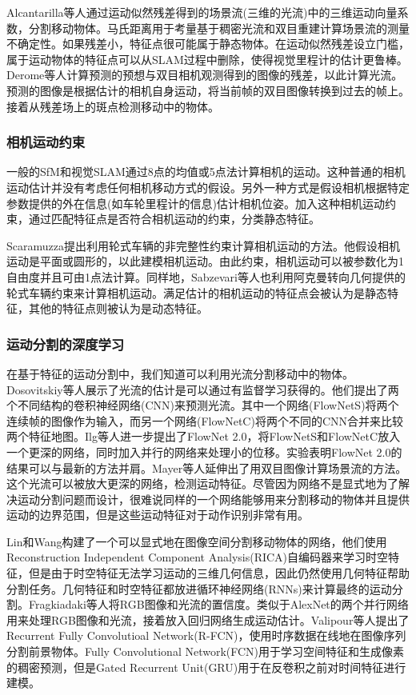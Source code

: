 Alcantarilla等人\cite{4}通过运动似然残差得到的场景流(三维的光流)中的三维运动向量系数，分割移动物体。马氏距离用于考量基于稠密光流和双目重建计算场景流的测量不确定性。如果残差小，特征点很可能属于静态物体。在运动似然残差设立门槛，属于运动物体的特征点可以从SLAM过程中删除，使得视觉里程计的估计更鲁棒。Derome等人\cite{30, 31}计算预测的预想与双目相机观测得到的图像的残差，以此计算光流。预测的图像是根据估计的相机自身运动，将当前帧的双目图像转换到过去的帧上。接着从残差场上的斑点检测移动中的物体。

\subsubsection{相机运动约束}
一般的SfM和视觉SLAM通过8点的均值\cite{53}或5点法\cite{116}计算相机的运动。这种普通的相机运动估计并没有考虑任何相机移动方式的假设。另外一种方式是假设相机根据特定参数提供的外在信息(如车轮里程计的信息)估计相机位姿。加入这种相机运动约束，通过匹配特征点是否符合相机运动的约束，分类静态特征。

Scaramuzza\cite{136}提出利用轮式车辆的非完整性约束计算相机运动的方法。他假设相机运动是平面或圆形的，以此建模相机运动。由此约束，相机运动可以被参数化为1自由度并且可由1点法计算\cite{137}。同样地，Sabzevari等人\cite{133}也利用阿克曼转向几何提供的轮式车辆约束来计算相机运动。满足估计的相机运动的特征点会被认为是静态特征，其他的特征点则被认为是动态特征。

\subsubsection{运动分割的深度学习}
在基于特征的运动分割中，我们知道可以利用光流分割移动中的物体。Dosovitskiy等人\cite{33}展示了光流的估计是可以通过有监督学习获得的。他们提出了两个不同结构的卷积神经网络(CNN)来预测光流。其中一个网络(FlowNetS)将两个连续帧的图像作为输入，而另一个网络(FlowNetC)将两个不同的CNN合并来比较两个特征地图。Ilg等人\cite{66}进一步提出了FlowNet 2.0，将FlowNetS和FlowNetC放入一个更深的网络，同时加入并行的网络来处理小的位移。实验表明FlowNet 2.0的结果可以与最新的方法并肩。Mayer等人\cite{101}延伸出了用双目图像计算场景流的方法。这个光流可以被放大更深的网络，检测运动特征\cite{48}。尽管因为网络不是显式地为了解决运动分割问题而设计，很难说同样的一个网络能够用来分割移动的物体并且提供运动的边界范围，但是这些运动特征对于动作识别非常有用\cite{47,146}。

Lin和Wang\cite{96}构建了一个可以显式地在图像空间分割移动物体的网络，他们使用Reconstruction Independent Component Analysis(RICA)自编码器\cite{86,87}来学习时空特征，但是由于时空特征无法学习运动的三维几何信息，因此仍然使用几何特征帮助分割任务。几何特征和时空特征都放进循环神经网络(RNNs)来计算最终的运动分割。Fragkiadaki等人\cite{38}将RGB图像和光流的置信度。类似于AlexNet\cite{79}的两个并行网络用来处理RGB图像和光流，接着放入回归网络生成运动估计。Valipour等人\cite{160}提出了Recurrent Fully Convolutioal Network(R-FCN)，使用时序数据在线地在图像序列分割前景物体。Fully Convolutional Network(FCN)\cite{98}用于学习空间特征和生成像素的稠密预测，但是Gated Recurrent Unit(GRU)用于在反卷积之前对时间特征进行建模。
